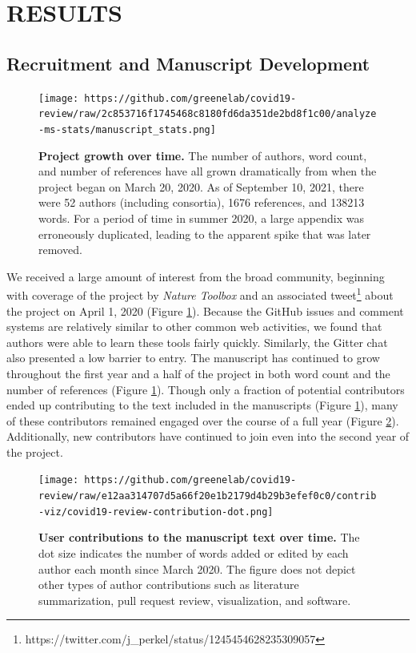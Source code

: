 \documentclass[twocolumn]{ceurart}
\begin{document}
\hypertarget{results}{%
\section{RESULTS}\label{results}}

\hypertarget{recruitment-and-manuscript-development}{%
\subsection{Recruitment and Manuscript Development}\label{recruitment-and-manuscript-development}}

\begin{figure}
\hypertarget{fig:projectstats}{%
\centering
\texttt{[image: https://github.com/greenelab/covid19-review/raw/2c853716f1745468c8180fd6da351de2bd8f1c00/analyze-ms-stats/manuscript\_stats.png]}
\caption{\textbf{Project growth over time.}
The number of authors, word count, and number of references have all grown dramatically from when the project began on March 20, 2020.
As of September 10, 2021, there were 52 authors (including consortia), 1676 references, and 138213 words.
For a period of time in summer 2020, a large appendix was erroneously duplicated, leading to the apparent spike that was later removed.}\label{fig:projectstats}
}
\end{figure}

We received a large amount of interest from the broad community, beginning with coverage of the project by \emph{Nature Toolbox} \citep{AE0QcVgJ} and an associated tweet\footnote{https://twitter.com/j\_perkel/status/1245454628235309057} about the project on April 1, 2020 (Figure \ref{fig:projectstats}).
Because the GitHub issues and comment systems are relatively similar to other common web activities, we found that authors were able to learn these tools fairly quickly.
Similarly, the Gitter chat also presented a low barrier to entry.
The manuscript has continued to grow throughout the first year and a half of the project in both word count and the number of references (Figure \ref{fig:projectstats}).
Though only a fraction of potential contributors ended up contributing to the text included in the manuscripts (Figure \ref{fig:projectstats}), many of these contributors remained engaged over the course of a full year (Figure \ref{fig:projectdots}).
Additionally, new contributors have continued to join even into the second year of the project.

\begin{figure}
\hypertarget{fig:projectdots}{%
\centering
\texttt{[image: https://github.com/greenelab/covid19-review/raw/e12aa314707d5a66f20e1b2179d4b29b3efef0c0/contrib-viz/covid19-review-contribution-dot.png]}
\caption{\textbf{User contributions to the manuscript text over time.}
The dot size indicates the number of words added or edited by each author each month since March 2020.
The figure does not depict other types of author contributions such as literature summarization, pull request review, visualization, and software.}\label{fig:projectdots}
}
\end{figure}
\end{document}
